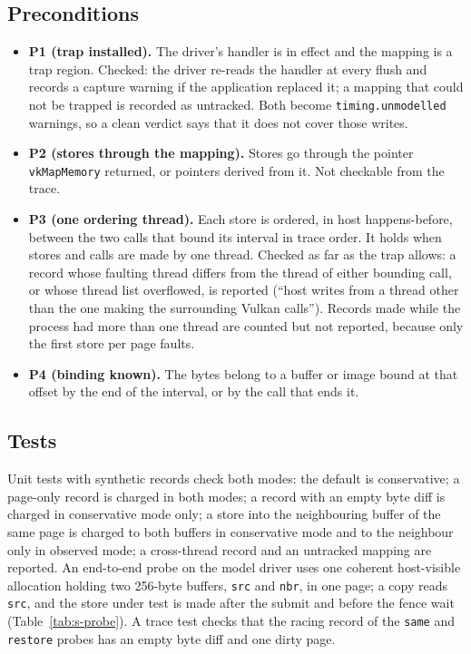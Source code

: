 \documentclass[acmtog,anonymous,review]{acmart}
\newcommand{\code}[1]{\texttt{#1}}
\begin{document}
\subsection{Preconditions}
\begin{itemize}
\item \textbf{P1 (trap installed).} The driver's handler is in effect and the mapping is a trap region. Checked: the
  driver re-reads the handler at every flush and records a capture warning if the application replaced it; a mapping
  that could not be trapped is recorded as untracked. Both become \code{timing.unmodelled} warnings, so a clean
  verdict says that it does not cover those writes.
\item \textbf{P2 (stores through the mapping).} Stores go through the pointer \code{vkMapMemory} returned, or pointers
  derived from it. Not checkable from the trace.
\item \textbf{P3 (one ordering thread).} Each store is ordered, in host happens-before, between the two calls that
  bound its interval in trace order. It holds when stores and calls are made by one thread. Checked as far as the trap
  allows: a record whose faulting thread differs from the thread of either bounding call, or whose thread list
  overflowed, is reported (``host writes from a thread other than the one making the surrounding Vulkan calls'').
  Records made while the process had more than one thread are counted but not reported, because only the first store
  per page faults.
\item \textbf{P4 (binding known).} The bytes belong to a buffer or image bound at that offset by the end of the
  interval, or by the call that ends it.
\end{itemize}

\subsection{Tests}
Unit tests with synthetic records check both modes: the default is conservative; a page-only record is charged in
both modes; a record with an empty byte diff is charged in conservative mode only; a store into the neighbouring buffer
of the same page is charged to both buffers in conservative mode and to the neighbour only in observed mode; a
cross-thread record and an untracked mapping are reported. An end-to-end probe on the model driver uses one coherent
host-visible allocation holding two 256-byte buffers, \code{src} and \code{nbr}, in one page; a copy reads \code{src},
and the store under test is made after the submit and before the fence wait (Table~\ref{tab:s-probe}). A trace test
checks that the racing record of the \code{same} and \code{restore} probes has an empty byte diff and one dirty page.
\end{document}
